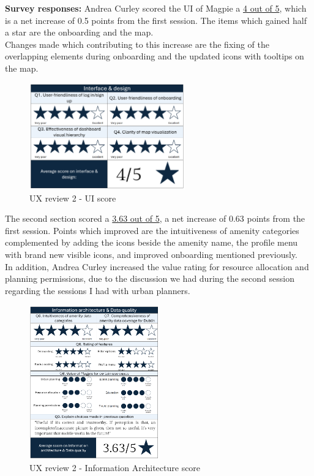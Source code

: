 \newpage
\noindent \textbf{Survey responses:}
Andrea Curley scored the UI of Magpie a \underline{4 out of 5}, which is a net increase of 0.5 points from the first session. The items which gained half a star are the onboarding and the map.\\
Changes made which contributing to this increase are the fixing of the overlapping elements during onboarding and the updated icons with tooltips on the map.
\begin{figure}[h!]
    \centering
    \includegraphics[width=0.6\textwidth]{images/ux-survey2-ui.png}
    \caption{UX review 2 - UI score}
\end{figure}

\noindent The second section scored a \underline{3.63 out of 5}, a net increase of 0.63 points from the first session. Points which improved are the intuitiveness of amenity categories complemented by adding the icons beside the amenity name, the profile menu with brand new visible icons, and improved onboarding mentioned previously.\\
In addition, Andrea Curley increased the value rating for resource allocation and planning permissions, due to the discussion we had during the second session regarding the sessions I had with urban planners.
\begin{figure}[h!]
    \centering
    \includegraphics[width=0.5\textwidth]{images/ux-survey2-data.png}
    \caption{UX review 2 - Information Architecture score}
\end{figure}

